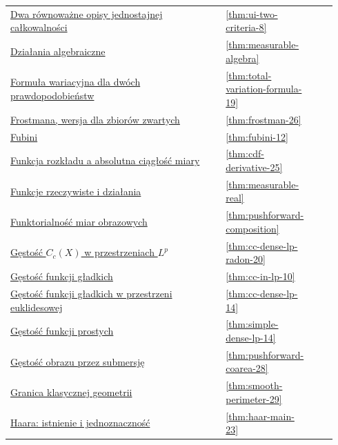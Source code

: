 \documentclass[11pt,a4paper,oneside]{book}
\numberwithin{equation}{chapter}
\theoremstyle{plain}
\theoremstyle{definition}
\theoremstyle{remark}
\begin{document}
\begin{longtable}{@{}p{0.72\linewidth}p{0.135\linewidth}p{0.08\linewidth}@{}}
\hyperref[thm:ui-two-criteria-8]{Dwa równoważne opisy jednostajnej całkowalności} & \ref*{thm:ui-two-criteria-8} & \pageref*{thm:ui-two-criteria-8} \\
\hyperref[thm:measurable-algebra]{Działania algebraiczne} & \ref*{thm:measurable-algebra} & \pageref*{thm:measurable-algebra} \\
\hyperref[thm:total-variation-formula-19]{Formuła wariacyjna dla dwóch prawdopodobieństw} & \ref*{thm:total-variation-formula-19} & \pageref*{thm:total-variation-formula-19} \\
\hyperref[thm:frostman-26]{Frostmana, wersja dla zbiorów zwartych} & \ref*{thm:frostman-26} & \pageref*{thm:frostman-26} \\
\hyperref[thm:fubini-12]{Fubini} & \ref*{thm:fubini-12} & \pageref*{thm:fubini-12} \\
\hyperref[thm:cdf-derivative-25]{Funkcja rozkładu a absolutna ciągłość miary} & \ref*{thm:cdf-derivative-25} & \pageref*{thm:cdf-derivative-25} \\
\hyperref[thm:measurable-real]{Funkcje rzeczywiste i działania} & \ref*{thm:measurable-real} & \pageref*{thm:measurable-real} \\
\hyperref[thm:pushforward-composition]{Funktorialność miar obrazowych} & \ref*{thm:pushforward-composition} & \pageref*{thm:pushforward-composition} \\
\hyperref[thm:cc-dense-lp-radon-20]{Gęstość $C_c(X)$ w przestrzeniach $L^p$} & \ref*{thm:cc-dense-lp-radon-20} & \pageref*{thm:cc-dense-lp-radon-20} \\
\hyperref[thm:cc-in-lp-10]{Gęstość funkcji gładkich} & \ref*{thm:cc-in-lp-10} & \pageref*{thm:cc-in-lp-10} \\
\hyperref[thm:cc-dense-lp-14]{Gęstość funkcji gładkich w przestrzeni euklidesowej} & \ref*{thm:cc-dense-lp-14} & \pageref*{thm:cc-dense-lp-14} \\
\hyperref[thm:simple-dense-lp-14]{Gęstość funkcji prostych} & \ref*{thm:simple-dense-lp-14} & \pageref*{thm:simple-dense-lp-14} \\
\hyperref[thm:pushforward-coarea-28]{Gęstość obrazu przez submersję} & \ref*{thm:pushforward-coarea-28} & \pageref*{thm:pushforward-coarea-28} \\
\hyperref[thm:smooth-perimeter-29]{Granica klasycznej geometrii} & \ref*{thm:smooth-perimeter-29} & \pageref*{thm:smooth-perimeter-29} \\
\hyperref[thm:haar-main-23]{Haara: istnienie i jednoznaczność} & \ref*{thm:haar-main-23} & \pageref*{thm:haar-main-23} \\

\end{longtable}
\end{document}
